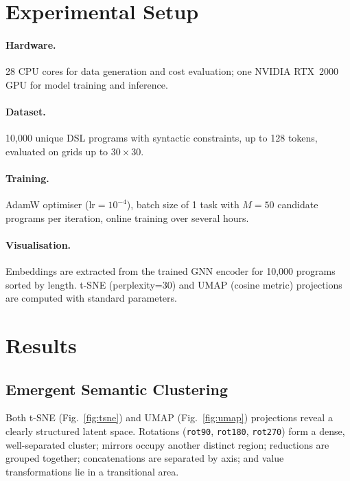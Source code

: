 \documentclass[final]{nesy2027}
\begin{document}
\section{Experimental Setup}
\label{sec:setup}

\paragraph{Hardware.}
28 CPU cores for data generation and cost evaluation; one NVIDIA RTX~2000 GPU
for model training and inference.

\paragraph{Dataset.}
10{,}000 unique DSL programs with syntactic constraints, up to 128 tokens,
evaluated on grids up to $30\times30$.

\paragraph{Training.}
AdamW optimiser ($\mathrm{lr}=10^{-4}$), batch size of 1 task with $M=50$
candidate programs per iteration, online training over several hours.

\paragraph{Visualisation.}
Embeddings are extracted from the trained GNN encoder for 10{,}000 programs sorted by
length.
t-SNE (perplexity=30) and UMAP (cosine metric) projections are computed with
standard parameters.

\section{Results}
\label{sec:results}

\subsection{Emergent Semantic Clustering}
\label{sec:clustering}

Both t-SNE (Fig.~\ref{fig:tsne}) and UMAP (Fig.~\ref{fig:umap}) projections
reveal a clearly structured latent space.
Rotations (\texttt{rot90}, \texttt{rot180}, \texttt{rot270}) form a dense,
well-separated cluster; mirrors occupy another distinct region; reductions are
grouped together; concatenations are separated by axis; and value transformations
lie in a transitional area.
\end{document}
